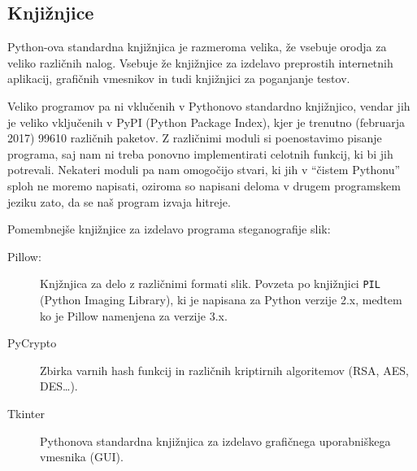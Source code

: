     \subsection{Knjižnjice}
        Python-ova standardna knjižnjica je razmeroma velika, že vsebuje orodja za veliko različnih nalog. Vsebuje že knjižnjice za izdelavo preprostih internetnih aplikacij, grafičnih vmesnikov in tudi knjižnjici za poganjanje testov.

        Veliko programov pa ni vklučenih v Pythonovo standardno knjižnjico, vendar jih je veliko vključenih v PyPI (Python Package Index), kjer je trenutno (februarja 2017) 99610 različnih paketov. Z različnimi moduli si poenostavimo pisanje programa, saj nam ni treba ponovno implementirati celotnih funkcij, ki bi jih potrevali. Nekateri moduli pa nam omogočijo stvari, ki jih v ``čistem Pythonu'' sploh ne moremo napisati, oziroma so napisani deloma v drugem programskem jeziku zato, da se naš program izvaja hitreje.

        Pomembnejše knjižnjice za izdelavo programa steganografije slik:
        \begin{description}
            \item [Pillow:] Knjžnjica za delo z različnimi formati slik. Povzeta po knjižnjici \texttt{PIL} (Python Imaging Library), ki je napisana za Python verzije 2.x, medtem ko je Pillow namenjena za verzije 3.x.  
            \item [PyCrypto] Zbirka varnih hash funkcij in različnih kriptirnih algoritemov (RSA, AES, DES\ldots).
            \item [Tkinter] Pythonova standardna knjižnjica za izdelavo grafičnega uporabniškega vmesnika (GUI).
        \end{description}
